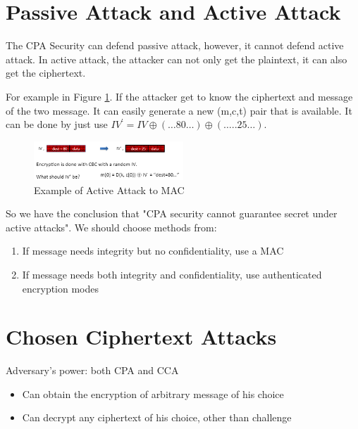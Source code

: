 


\section{Passive Attack and Active Attack}

The CPA Security can defend passive attack, however, it cannot defend active attack. In active attack, the attacker can not only get the plaintext, it can also get the ciphertext.

For example in Figure \ref{fig: 05 Example of Active Attack to MAC}. If the attacker get to know the ciphertext and message of the two message. It can easily generate a new (m,c,t) pair that is available. It can be done by just use $I V^{\prime}=I V \oplus(\ldots 80 \ldots) \oplus(\ldots . .25 \ldots)$.

\begin{figure}[h]
    \centering
    \includegraphics[width=0.5\textwidth]{Stanford_Crypto_1/fig/05_Authentication/An active attack to MAC.png}
    \caption{Example of Active Attack to MAC}
    \label{fig: 05 Example of Active Attack to MAC}
\end{figure}

So we have the conclusion that "CPA security cannot guarantee secret under active attacks". We should choose methods from:

\begin{enumerate}
    \item If message needs integrity but no confidentiality, use a MAC
    \item If message needs both integrity and confidentiality, use authenticated encryption modes
\end{enumerate}

\section{Chosen Ciphertext Attacks}

Adversary's power: both CPA and CCA
\begin{itemize}
    \item Can obtain the encryption of arbitrary message of his choice
    \item Can decrypt any ciphertext of his choice, other than challenge
\end{itemize}

